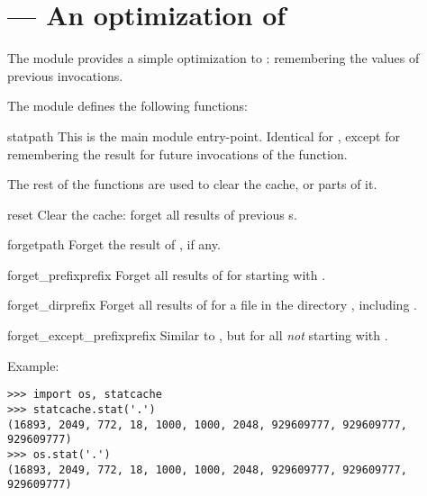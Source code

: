 \section{ ---
         An optimization of }


The  module provides a simple optimization to
: remembering the values of previous invocations.

The  module defines the following functions:

\begin{funcdesc}{stat}{path}
This is the main module entry-point.
Identical for , except for remembering the result
for future invocations of the function.
\end{funcdesc}

The rest of the functions are used to clear the cache, or parts of
it.

\begin{funcdesc}{reset}{}
Clear the cache: forget all results of previous s.
\end{funcdesc}

\begin{funcdesc}{forget}{path}
Forget the result of , if any.
\end{funcdesc}

\begin{funcdesc}{forget_prefix}{prefix}
Forget all results of  for  starting
with .
\end{funcdesc}

\begin{funcdesc}{forget_dir}{prefix}
Forget all results of  for  a file in
the directory , including .
\end{funcdesc}

\begin{funcdesc}{forget_except_prefix}{prefix}
Similar to , but for all 
\emph{not} starting with .
\end{funcdesc}

Example:

\begin{verbatim}
>>> import os, statcache
>>> statcache.stat('.')
(16893, 2049, 772, 18, 1000, 1000, 2048, 929609777, 929609777, 929609777)
>>> os.stat('.')
(16893, 2049, 772, 18, 1000, 1000, 2048, 929609777, 929609777, 929609777)
\end{verbatim}

